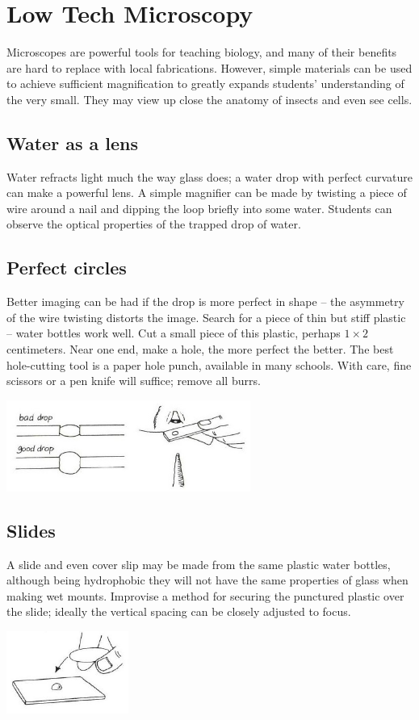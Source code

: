 \chapter{Low Tech Microscopy}
\label{cha:microscopy}
Microscopes are powerful tools for teaching biology, and many of their benefits are hard to replace with local fabrications. However, simple materials can be used to achieve sufficient magnification to greatly expands students' understanding of the very small. They may view up close the anatomy of insects and even see cells.

\section{Water as a lens}
Water refracts light much the way glass does; a water drop with perfect curvature can make a powerful lens. A simple magnifier can be made by twisting a piece of wire around a nail and dipping the loop briefly into some water. Students can observe the optical properties of the trapped drop of water.

\section{Perfect circles}
Better imaging can be had if the drop is more perfect in shape -- the asymmetry of the wire twisting distorts the image. Search for a piece of thin but stiff plastic -- water bottles work well. Cut a small piece of this plastic, perhaps $1 \times 2$ centimeters. Near one end, make a hole, the more perfect the better. The best hole-cutting tool is a paper hole punch, available in many schools. With care, fine scissors or a pen knife will suffice; remove all burrs.
\begin{center}
\includegraphics[width=8cm]{./img/vso/water-drop.jpg}
\end{center}

\section{Slides}
A slide and even cover slip may be made from the same plastic water bottles, although being hydrophobic they will not have the same properties of glass when making wet mounts. Improvise a method for securing the punctured plastic over the slide; ideally the vertical spacing can be closely adjusted to focus.
\begin{center}
\includegraphics[width=4cm]{./img/vso/slide-cover-slip.jpg}
\end{center}

